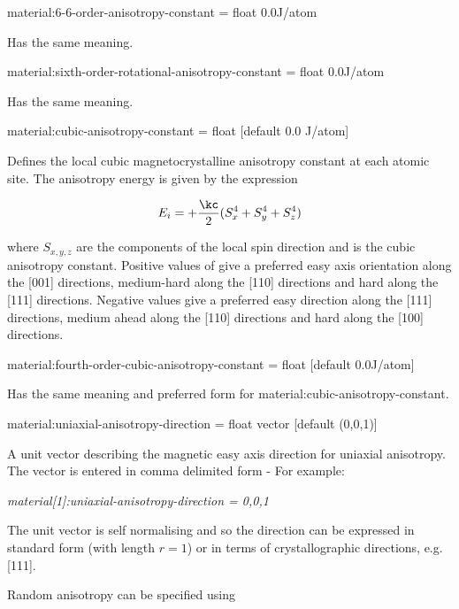 {\zicf material:6-6-order-anisotropy-constant = float 0.0\newline J/atom} Has the same meaning.

{\zicf material:sixth-order-rotational-anisotropy-constant = float 0.0\newline J/atom} Has the same meaning.

{\zicf material:cubic-anisotropy-constant = float [default 0.0 J/atom]}
Defines the local cubic magnetocrystalline anisotropy constant at each atomic site. The anisotropy energy is given by the expression

\begin{equation*}
E_i = +\frac{\kc}{2} (S_x^4 + S_y^4 + S_z^4)
\end{equation*}

\noindent where $S_{x,y,z}$ are the components of the local spin direction and \kc is the cubic anisotropy constant. Positive values of \kc give a preferred easy axis orientation along the [001] directions, medium-hard along the [110] directions and hard along the [111] directions. Negative values give a preferred easy direction along the [111] directions, medium ahead along the [110] directions and hard along the [100] directions.

{\zicf material:fourth-order-cubic-anisotropy-constant = float [default 0.0\newline J/atom]} Has the same meaning and preferred form for material:cubic-anisotropy-constant.

{\zicf material:uniaxial-anisotropy-direction = float vector [default (0,0,1)]} A unit vector \ei describing the magnetic easy axis direction for uniaxial anisotropy. The vector is entered in comma delimited form - For example:

\textit{material[1]:uniaxial-anisotropy-direction = 0,0,1}

\noindent The unit vector is self normalising and so the direction can be expressed in standard form (with length $r =  1$) or in terms of crystallographic directions, e.g. [111].

\noindent Random anisotropy can be specified using

